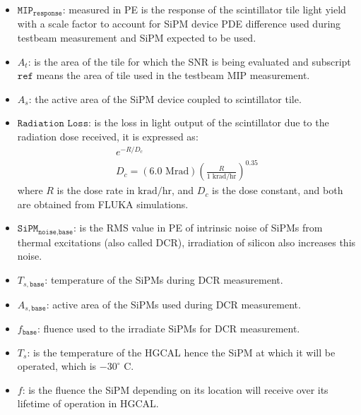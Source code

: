 \begin{itemize}
  \item \( \texttt{MIP}_\texttt{response} \): measured in \gls{PE} is the
        response of the scintillator tile light yield with a scale factor to account for \gls{SiPM} device
        \gls{PDE} difference used during testbeam measurement and
        \gls{SiPM} expected to be used.
  \item \( A_t \): is the area of the tile for which the \gls{SNR} is being
        evaluated and subscript \( \texttt{ref} \) means the area of tile
        used in the testbeam \gls{MIP} measurement.
  \item \( A_s \): the active area of the
        \gls{SiPM} device coupled to scintillator tile.
  \item \( \texttt{Radiation Loss} \): is the loss in light output
        of the scintillator
        due to the radiation dose received, it is expressed as:
        \begin{gather}
          e^{-R/D_{c}} \\
          D_c = (6.0 \text{ Mrad})
          {\left( \frac{R}{1 \xspace\text{ krad/hr}} \right)}^{0.35}
        \end{gather}
        where \( R \) is the dose rate in \( \text{krad/hr} \), and \( D_c \) is the
        dose constant, and both are obtained from \textsc{FLUKA} simulations.
  \item \( \texttt{SiPM}_\texttt{noise,base} \):
        is the \gls{RMS} value in \gls{PE} of
        intrinsic noise of \glspl{SiPM} from thermal excitations
        (also called \gls{DCR}),
        irradiation of silicon also increases this noise.
  \item \( T_{s,\texttt{base}}\): temperature of the \glspl{SiPM} during
        \gls{DCR} measurement.
  \item \( A_{s,\texttt{base}}\): active area of the \glspl{SiPM} used during
        \gls{DCR} measurement.
  \item \( f_{\texttt{base}}\): fluence used to the irradiate \glspl{SiPM} for  \gls{DCR} measurement.
  \item \( T_s \): is the temperature of the \gls{HGCAL} hence the \gls{SiPM}
        at which it will be operated, which is \( -30^\circ \text{ C} \).
  \item \( f \): is the fluence the \gls{SiPM} depending on its location will receive over its
        lifetime of operation in \gls{HGCAL}.
\end{itemize}

